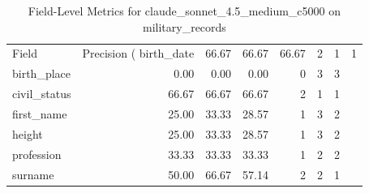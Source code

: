 \begin{table}
\caption{Field-Level Metrics for claude_sonnet_4.5_medium_c5000 on military_records}
\label{tab:fields_claude_sonnet_4.5_medium_c5000_military_records}
\begin{tabular}{lrrrrrr}
\toprule
Field & Precision (%
\midrule
birth_date & 66.67 & 66.67 & 66.67 & 2 & 1 & 1 \\
birth_place & 0.00 & 0.00 & 0.00 & 0 & 3 & 3 \\
civil_status & 66.67 & 66.67 & 66.67 & 2 & 1 & 1 \\
first_name & 25.00 & 33.33 & 28.57 & 1 & 3 & 2 \\
height & 25.00 & 33.33 & 28.57 & 1 & 3 & 2 \\
profession & 33.33 & 33.33 & 33.33 & 1 & 2 & 2 \\
surname & 50.00 & 66.67 & 57.14 & 2 & 2 & 1 \\
\bottomrule
\end{tabular}
\end{table}
